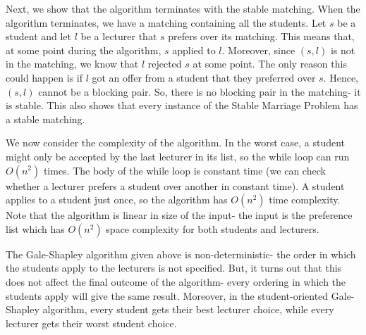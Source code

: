 \documentclass[a4paper, openany]{memoir}
\begin{document}
    Next, we show that the algorithm terminates with the stable matching. When the algorithm terminates, we have a matching containing all the students. Let $s$ be a student and let $l$ be a lecturer that $s$ prefers over its matching. This means that, at some point during the algorithm, $s$ applied to $l$. Moreover, since $(s, l)$ is not in the matching, we know that $l$ rejected $s$ at some point. The only reason this could happen is if $l$ got an offer from a student that they preferred over $s$. Hence, $(s, l)$ cannot be a blocking pair. So, there is no blocking pair in the matching- it is stable. This also shows that every instance of the Stable Marriage Problem has a stable matching.
    
    We now consider the complexity of the algorithm. In the worst case, a student might only be accepted by the last lecturer in its list, so the while loop can run $O(n^2)$ times. The body of the while loop is constant time (we can check whether a lecturer prefers a student over another in constant time). A student applies to a student just once, so the algorithm has $O(n^2)$ time complexity. Note that the algorithm is linear in size of the input- the input is the preference list which has $O(n^2)$ space complexity for both students and lecturers.

    The Gale-Shapley algorithm given above is non-deterministic- the order in which the students apply to the lecturers is not specified. But, it turns out that this does not affect the final outcome of the algorithm- every ordering in which the students apply will give the same result. Moreover, in the student-oriented Gale-Shapley algorithm, every student gets their best lecturer choice, while every lecturer gets their worst student choice.
\end{document}
